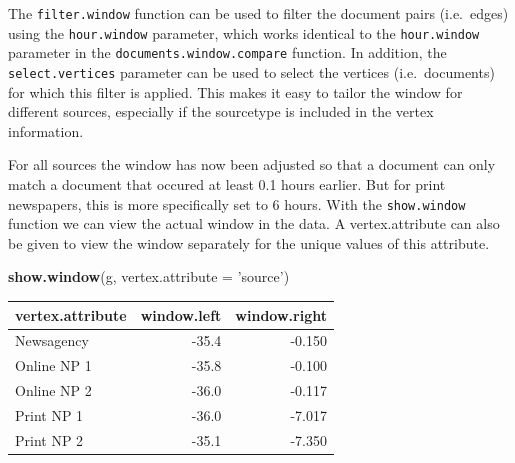 \documentclass[]{article}
\newenvironment{Shaded}{\begin{snugshade}}{\end{snugshade}}
\newcommand{\KeywordTok}[1]{\textcolor[rgb]{0.13,0.29,0.53}{\textbf{{#1}}}}
\newcommand{\DataTypeTok}[1]{\textcolor[rgb]{0.13,0.29,0.53}{{#1}}}
\newcommand{\DecValTok}[1]{\textcolor[rgb]{0.00,0.00,0.81}{{#1}}}
\newcommand{\FloatTok}[1]{\textcolor[rgb]{0.00,0.00,0.81}{{#1}}}
\newcommand{\StringTok}[1]{\textcolor[rgb]{0.31,0.60,0.02}{{#1}}}
\newcommand{\CommentTok}[1]{\textcolor[rgb]{0.56,0.35,0.01}{\textit{{#1}}}}
\newcommand{\NormalTok}[1]{{#1}}
\begin{document}
The \texttt{filter.window} function can be used to filter the document
pairs (i.e.~edges) using the \texttt{hour.window} parameter, which works
identical to the \texttt{hour.window} parameter in the
\texttt{documents.window.compare} function. In addition, the
\texttt{select.vertices} parameter can be used to select the vertices
(i.e.~documents) for which this filter is applied. This makes it easy to
tailor the window for different sources, especially if the sourcetype is
included in the vertex information.

\begin{Shaded}
\end{Shaded}

For all sources the window has now been adjusted so that a document can
only match a document that occured at least 0.1 hours earlier. But for
print newspapers, this is more specifically set to 6 hours. With the
\texttt{show.window} function we can view the actual window in the data.
A vertex.attribute can also be given to view the window separately for
the unique values of this attribute.

\begin{Shaded}
\begin{Highlighting}[]
\KeywordTok{show.window}\NormalTok{(g, }\DataTypeTok{vertex.attribute =} \StringTok{'source'}\NormalTok{)}
\end{Highlighting}
\end{Shaded}

\begin{longtable}[c]{@{}lrr@{}}
\toprule
vertex.attribute & window.left & window.right\tabularnewline
\midrule
\endhead
Newsagency & -35.4 & -0.150\tabularnewline
Online NP 1 & -35.8 & -0.100\tabularnewline
Online NP 2 & -36.0 & -0.117\tabularnewline
Print NP 1 & -36.0 & -7.017\tabularnewline
Print NP 2 & -35.1 & -7.350\tabularnewline
\bottomrule
\end{longtable}
\end{document}
